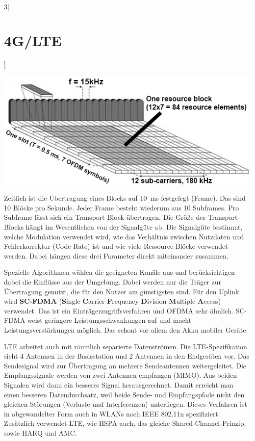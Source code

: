 \begin{multicols}{3}[\section{4G/LTE}]
\begin{Figure}
\includegraphics[width=\linewidth]{Kapitel/4GLTE/Grafiken/lte_ofdm.png}
\label{fig:frequenzband}
\end{Figure}

Zeitlich ist die Übertragung eines Blocks auf \SI{10}{\milli\second} festgelegt (Frame). Das sind 10 Blöcke pro Sekunde. Jeder Frame besteht wiederum aus 10 Subframes. Pro Subframe lässt sich ein Transport-Block übertragen. Die Größe des Transport-Blocks hängt im Wesentlichen von der Signalgüte ab. Die Signalgüte bestimmt, welche Modulation verwendet wird, wie das Verhältnis zwischen Nutzdaten und Fehlerkorrektur (Code-Rate) ist und wie viele Ressource-Blöcke verwendet werden. Dabei hängen diese drei Parameter direkt miteinander zusammen.

Spezielle Algorithmen wählen die geeigneten Kanäle aus und berücksichtigen dabei die Einflüsse aus der Umgebung. Dabei werden nur die Träger zur Übertragung genutzt, die für den Nutzer am günstigsten sind.
Für den Uplink wird \textbf{SC-FDMA} (\textbf{S}ingle \textbf{C}arrier \textbf{F}requency \textbf{D}ivision \textbf{M}ultiple \textbf{A}ccess) verwendet. Das ist ein Einträgerzugriffsverfahren und OFDMA sehr ähnlich. SC-FDMA weist geringere Leistungsschwankungen auf und macht Leistungsverstärkungen möglich. Das schont vor allem den Akku mobiler Geräte.

LTE arbeitet auch mit räumlich separierte Datenströmen. Die LTE-Spezifikation sieht 4 Antennen in der Basisstation und 2 Antennen in den Endgeräten vor. Das Sendesignal wird zur Übertragung an mehrere Sendeantennen weitergeleitet. Die Empfangssignale werden von zwei Antennen empfangen (MIMO). Aus beiden Signalen wird dann ein besseres Signal herausgerechnet. Damit erreicht man einen besseren Datendurchsatz, weil beide Sende- und Empfangspfade nicht den gleichen Störungen (Verluste und Interferenzen) unterliegen. Dieses Verfahren ist in abgewandelter Form auch in WLANs nach IEEE 802.11n spezifiziert. Zusätzlich verwendet LTE, wie HSPA auch, das gleiche Shared-Channel-Prinzip, sowie HARQ und AMC. ~\cite{4GLTE.4}
 


\end{multicols}
